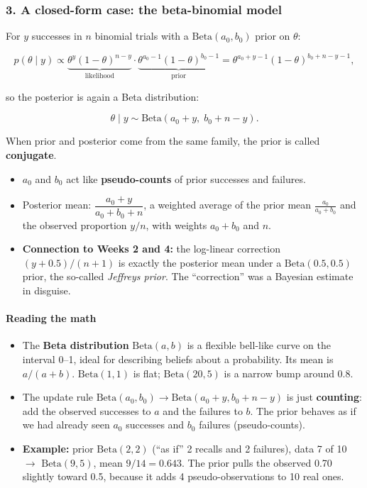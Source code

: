 \subsubsection{3. A closed-form case: the beta-binomial model}

For \(y\) successes in \(n\) binomial trials with a
\(\mathrm{Beta}(a_0, b_0)\) prior on \(\theta\):

\[
p(\theta \mid y) \propto \underbrace{\theta^{y}(1-\theta)^{n-y}}_{\text{likelihood}} \cdot \underbrace{\theta^{a_0 - 1}(1-\theta)^{b_0 - 1}}_{\text{prior}}
= \theta^{a_0 + y - 1}(1-\theta)^{b_0 + n - y - 1},
\]

so the posterior is again a Beta distribution:

\[
\theta \mid y \sim \mathrm{Beta}(a_0 + y,\; b_0 + n - y).
\]

When prior and posterior come from the same family, the prior is called
\textbf{conjugate}.

\begin{itemize}
\tightlist
\item
  \(a_0\) and \(b_0\) act like \textbf{pseudo-counts} of prior successes
  and failures.
\item
  Posterior mean: \(\dfrac{a_0 + y}{a_0 + b_0 + n}\), a weighted average
  of the prior mean \(\frac{a_0}{a_0 + b_0}\) and the observed
  proportion \(y/n\), with weights \(a_0 + b_0\) and \(n\).
\item
  \textbf{Connection to Weeks 2 and 4:} the log-linear correction
  \((y + 0.5)/(n + 1)\) is exactly the posterior mean under a
  \(\mathrm{Beta}(0.5, 0.5)\) prior, the so-called \emph{Jeffreys
  prior}. The ``correction'' was a Bayesian estimate in disguise.
\end{itemize}

\paragraph{Reading the math}

\begin{itemize}
\tightlist
\item
  The \textbf{Beta distribution} \(\mathrm{Beta}(a, b)\) is a flexible
  bell-like curve on the interval 0--1, ideal for describing beliefs
  about a probability. Its mean is \(a/(a+b)\). \(\mathrm{Beta}(1,1)\)
  is flat; \(\mathrm{Beta}(20, 5)\) is a narrow bump around 0.8.
\item
  The update rule
  \(\mathrm{Beta}(a_0, b_0) \to \mathrm{Beta}(a_0 + y, b_0 + n - y)\) is
  just \textbf{counting}: add the observed successes to \(a\) and the
  failures to \(b\). The prior behaves as if we had already seen \(a_0\)
  successes and \(b_0\) failures (pseudo-counts).
\item
  \textbf{Example:} prior \(\mathrm{Beta}(2, 2)\) (``as if'' 2 recalls
  and 2 failures), data 7 of 10 \ensuremath{\rightarrow} \(\mathrm{Beta}(9, 5)\), mean
  \(9/14 = 0.643\). The prior pulls the observed 0.70 slightly toward
  0.5, because it adds 4 pseudo-observations to 10 real ones.
\end{itemize}

